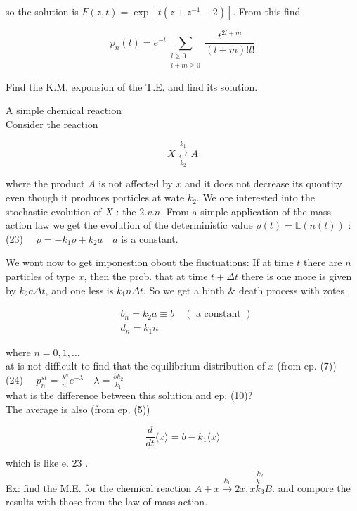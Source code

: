 \documentclass[10pt]{article}
\begin{document}
so the solution is $F(z, t)=\exp \left[t\left(z+z^{-1}-2\right)\right]$. From this find

$$
p_{n}(t)=e^{-t} \sum_{\substack{l \geqslant 0 \\ l+m \geqslant 0}} \frac{t^{2 l+m}}{(l+m)!l!}
$$

Find the K.M. exponsion of the T.E. and find its solution.

A simple chemical reaction\\
Consider the reaction

$$
X \underset{k_{2}}{\stackrel{k_{1}}{\rightleftarrows}} A
$$

where the product $A$ is not affected by $x$ and it does not decrease its quontity even though it produces porticles at wate $k_{2}$. We ore interested into the stochastic evolution of $X$ : the $2 . v . n$. From a simple application of the mass action law we get the evolution of the deterministic value $\rho(t)=\mathbb{E}(n(t))$ :\\
(23) $\quad \dot{\rho}=-k_{1} \rho+k_{2} a \quad a$ is a constant.

We wont now to get imponestion obout the fluctuations: If at time $t$ there are $n$ particles of type $x$, then the prob. that at time $t+\Delta t$ there is one more is given by $k_{2} a \Delta t$, and one less is $k_{1} n \Delta t$. So we get a binth \& death process with zotes

$$
\begin{aligned}
& b_{n}=k_{2} a \equiv b \quad(\text { a constant }) \\
& d_{n}=k_{1} n
\end{aligned}
$$

where $n=0,1, \ldots$\\
at is not difficult to find that the equilibrium distribution of $x$ (from ep. (7))\\
(24) $\quad p_{n}^{s t}=\frac{\lambda^{n}}{n!} e^{-\lambda} \quad \lambda=\frac{\partial k_{2}}{k_{1}}$\\
what is the difference between this solution and ep. (10)?\\
The average is also (from ep. (5))

$$
\frac{d}{d t}\langle x\rangle=b-k_{1}\langle x\rangle
$$

which is like e. 23 .\\
Ex: find the M.E. for the chemical reaction $A+x \xrightarrow{k_{1}} 2 x, x \stackrel{k_{2}}{\stackrel{k}{k}_{3}} B$. and compore the results with those from the law of mass action.
\end{document}
